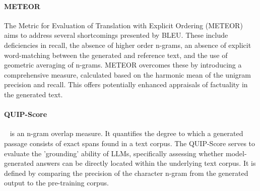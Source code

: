 \paragraph{METEOR}
The Metric for Evaluation of Translation with Explicit Ordering (METEOR) \citep{banerjee2005meteor} aims to address several shortcomings presented by BLEU. These include deficiencies in recall, the absence of higher order n-grams, an absence of explicit word-matching between the generated and reference text, and the use of geometric averaging of n-grams. METEOR overcomes these by introducing a comprehensive measure, calculated based on the harmonic mean of the unigram precision and recall. This offers potentially enhanced appraisals of factuality in the generated text.


\paragraph{QUIP-Score}~\citep{weller2023according}  is an n-gram overlap measure. It quantifies the degree to which a generated passage consists of exact spans found in a text corpus. The QUIP-Score serves to evaluate the 'grounding' ability of LLMs, specifically assessing whether model-generated answers can be directly located within the underlying text corpus. It is defined by comparing the precision of the character n-gram from the generated output to the pre-training corpus. 





